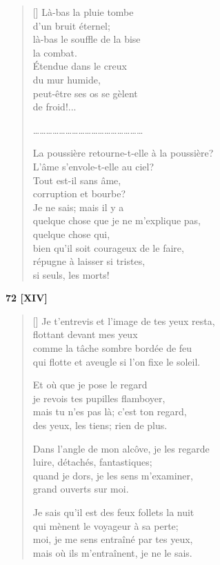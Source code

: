 \documentclass[a4paper,12pt]{book}
\begin{document}
\begin{verse}[\versewidth]
  Là-bas la pluie tombe \\
  d'un bruit éternel; \\
  là-bas le souffle de la bise \\
  la combat. \\
  Étendue dans le creux \\
  du mur humide, \\
  peut-être ses os se gèlent \\
  de froid!...

\ldots\ldots\ldots\ldots\ldots\ldots\ldots\ldots\ldots\ldots\ldots\ldots\ldots\ldots\ldots\ldots\ldots

  La poussière retourne-t-elle à la poussière? \\
  L'âme s'envole-t-elle au ciel? \\
  Tout est-il sans âme, \\
  corruption et bourbe? \\
  Je ne sais; mais il y a \\
  quelque chose que je ne m'explique pas, \\
  quelque chose qui, \\
  bien qu'il soit courageux de le faire, \\
  répugne à laisser si tristes, \\
  si seuls, les morts!
\end{verse}

\bigskip

\begin{center}
  \textbf{72 [XIV]}
\end{center}

\settowidth{\versewidth}{Je sais qu'il est des feux follets la nuit}

\begin{verse}[\versewidth]
  Je t'entrevis et l'image de tes yeux resta, \\
  flottant devant mes yeux \\
  comme la tâche sombre bordée de feu \\
  qui flotte et aveugle si l'on fixe le soleil.

  Et où que je pose le regard \\
  je revois tes pupilles flamboyer, \\
  mais tu n'es pas là; c'est ton regard, \\
  des yeux, les tiens; rien de plus.

  Dans l'angle de mon alcôve, je les regarde \\
  luire, détachés, fantastiques; \\
  quand je dors, je les sens m'examiner, \\
  grand ouverts sur moi.

  Je sais qu'il est des feux follets la nuit \\
  qui mènent le voyageur à sa perte; \\
  moi, je me sens entraîné par tes yeux, \\
  mais où ils m'entraînent, je ne le sais.
\end{verse}
\end{document}
